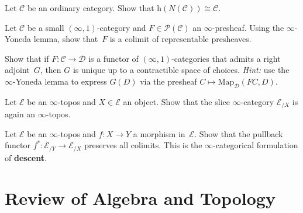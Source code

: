 \begin{exercise}\label{ex:homotopy-cat-nerve}
Let $\mathcal{C}$ be an ordinary category.  Show that
$\mathrm{h}(N(\mathcal{C})) \cong \mathcal{C}$.
\end{exercise}

\begin{exercise}\label{ex:infty-presheaf-colim}
Let $\mathcal{C}$ be a small $(\infty,1)$-category and
$F\in\mathcal{P}(\mathcal{C})$ an $\infty$-presheaf.  Using the
$\infty$-Yoneda lemma, show that~$F$ is a colimit of representable
presheaves.
\end{exercise}

\begin{exercise}\label{ex:infty-adj-unique}
Show that if $F\colon\mathcal{C}\to\mathcal{D}$ is a functor of
$(\infty,1)$-categories that admits a right adjoint~$G$, then $G$ is
unique up to a contractible space of choices.
\textit{Hint:} use the $\infty$-Yoneda lemma to express $G(D)$ via
the presheaf $C\mapsto\mathrm{Map}_\mathcal{D}(FC, D)$.
\end{exercise}

\begin{exercise}\label{ex:infty-topos-slice}
Let $\mathcal{E}$ be an $\infty$-topos and $X\in\mathcal{E}$ an object.
Show that the slice $\infty$-category $\mathcal{E}_{/X}$ is again an
$\infty$-topos.
\end{exercise}

\begin{exercise}[Descent]\label{ex:infty-descent}
Let $\mathcal{E}$ be an $\infty$-topos and $f\colon X\to Y$ a morphism
in~$\mathcal{E}$.  Show that the pullback functor
$f^*\colon\mathcal{E}_{/Y}\to\mathcal{E}_{/X}$ preserves all colimits.
This is the $\infty$-categorical formulation of \textbf{descent}.
\end{exercise}




\appendix

\chapter{Review of Algebra and Topology}\label{app:review}
\minitoc

